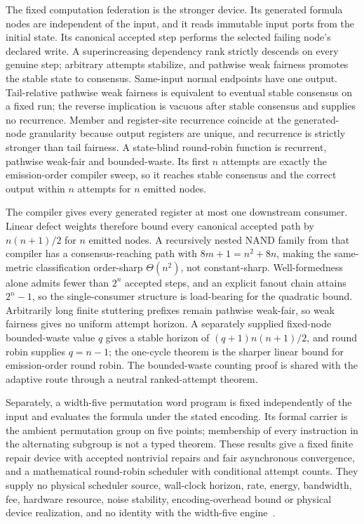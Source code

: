 \documentclass[11pt]{article}
\theoremstyle{remark}
\theoremstyle{plain}
\begin{document}
The fixed computation federation is the stronger device. Its generated
formula nodes are independent of the input, and it reads immutable input
ports from the initial state. Its canonical accepted step performs the
selected failing node's declared write. A superincreasing dependency rank
strictly descends on every genuine step; arbitrary attempts stabilize, and
pathwise weak fairness promotes the stable state to consensus. Same-input
normal endpoints have one output. Tail-relative pathwise weak fairness is
equivalent to eventual stable consensus on a fixed run; the reverse
implication is vacuous after stable consensus and supplies no recurrence.
Member and register-site recurrence coincide at the generated-node
granularity because output registers are unique, and recurrence is
strictly stronger than tail fairness. A state-blind round-robin function is
recurrent, pathwise weak-fair and bounded-waste. Its first \(n\) attempts
are exactly the emission-order compiler sweep, so it reaches stable
consensus and the correct output within \(n\) attempts for \(n\) emitted
nodes.

The compiler gives every generated register at most one downstream
consumer. Linear defect weights therefore bound every canonical accepted
path by \(n(n+1)/2\) for \(n\) emitted nodes. A recursively nested NAND
family from that compiler has a consensus-reaching path with
\(8m+1=n^2+8n\), making the same-metric classification order-sharp
\(\Theta(n^2)\), not constant-sharp. Well-formedness alone admits fewer
than \(2^n\) accepted steps, and an explicit fanout chain attains
\(2^n-1\), so the single-consumer structure is load-bearing for the
quadratic bound. Arbitrarily long finite stuttering prefixes remain
pathwise weak-fair, so weak fairness gives no uniform attempt horizon. A
separately supplied fixed-node bounded-waste value \(q\) gives a stable
horizon of \((q+1)n(n+1)/2\), and round robin supplies \(q=n-1\); the
one-cycle theorem is the sharper linear bound for emission-order round
robin. The bounded-waste counting proof is shared with the adaptive route
through a neutral ranked-attempt theorem.

Separately, a width-five permutation word program is fixed independently of
the input and evaluates the formula under the stated encoding. Its formal
carrier is the ambient permutation group on five points; membership of
every instruction in the alternating subgroup is not a typed theorem. These
results give a fixed finite repair device with accepted nontrivial repairs
and fair asynchronous convergence, and a mathematical round-robin scheduler
with conditional attempt counts. They supply no physical scheduler source,
wall-clock horizon, rate, energy, bandwidth, fee, hardware resource, noise
stability, encoding-overhead bound or physical device realization, and no
identity with the width-five engine~\cite{ophrepo}.
\end{document}
